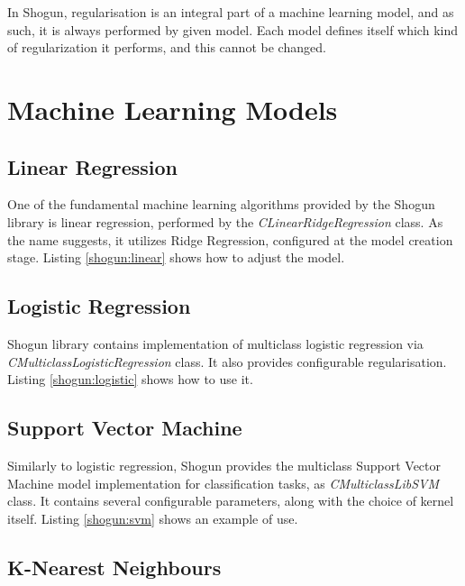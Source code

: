 In Shogun, regularisation is an integral part of a machine learning model, and as such, it is always performed by given model. Each model defines itself which kind of regularization it performs, and this cannot be changed.

\section{Machine Learning Models}
\subsection{Linear Regression}
One of the fundamental machine learning algorithms provided by the Shogun library is linear regression, performed by the \textit{CLinearRidgeRegression} class. As the name suggests, it utilizes Ridge Regression, configured at the model creation stage. Listing \ref{shogun:linear} shows how to adjust the model.

\newpage
{}

\subsection{Logistic Regression}
Shogun library contains implementation of multiclass logistic regression via \textit{CMulticlassLogisticRegression} class. It also provides configurable regularisation. Listing \ref{shogun:logistic} shows how to use it.


\subsection{Support Vector Machine}
Similarly to logistic regression, Shogun provides the multiclass Support Vector Machine model implementation for classification tasks, as \textit{CMulticlassLibSVM} class. It contains several configurable parameters, along with the choice of kernel itself. Listing \ref{shogun:svm} shows an example of use.


\hspace{20px}

\subsection{K-Nearest Neighbours}

